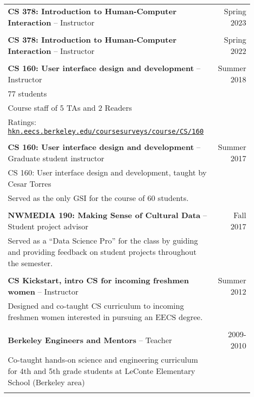 \begin{longtable}{Xr}
	\textbf{CS 378: Introduction to Human-Computer Interaction} -- Instructor & Spring 2023 \\
	\\

	\textbf{CS 378: Introduction to Human-Computer Interaction} -- Instructor & Spring 2022 \\
	\\

	\textbf{CS 160: User interface design and development} -- Instructor & Summer 2018 \\
	77 students &  \\
	Course staff of 5 TAs and 2 Readers &  \\
	Ratings: \href{https://hkn.eecs.berkeley.edu/coursesurveys/course/CS/160}{\tt hkn.eecs.berkeley.edu/coursesurveys/course/CS/160} &  \\
	\\

	\textbf{CS 160: User interface design and development} -- Graduate student instructor & Summer 2017 \\
	CS 160: User interface design and development, taught by Cesar Torres &  \\
	Served as the only GSI for the course of 60 students. &  \\
	\\

	\textbf{NWMEDIA 190: Making Sense of Cultural Data} -- Student project advisor & Fall 2017 \\
	Served as a “Data Science Pro” for the class by guiding and providing feedback on student projects throughout the semester. &  \\
	\\

	\textbf{CS Kickstart, intro CS for incoming freshmen women} -- Instructor & Summer 2012 \\
	Designed and co-taught CS curriculum to incoming freshmen women interested in pursuing an EECS degree. &  \\
	\\

	\textbf{Berkeley Engineers and Mentors} -- Teacher & 2009-2010 \\
	Co-taught hands-on science and engineering curriculum for 4th and 5th grade students at LeConte Elementary School (Berkeley area) &  \\
	\\

\end{longtable}